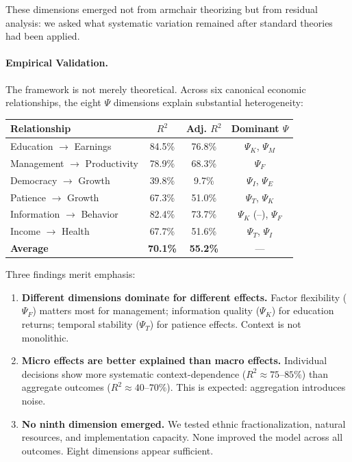 \documentclass[12pt,a4paper]{article}
\begin{document}
These dimensions emerged not from armchair theorizing but from residual analysis: we asked what systematic variation remained after standard theories had been applied.

\paragraph{Empirical Validation.}
The framework is not merely theoretical. Across six canonical economic relationships, the eight $\Psi$ dimensions explain substantial heterogeneity:

\begin{center}
\begin{tabular}{@{}lccc@{}}
\toprule
\textbf{Relationship} & \textbf{$R^2$} & \textbf{Adj. $R^2$} & \textbf{Dominant $\Psi$} \\
\midrule
Education $\rightarrow$ Earnings & 84.5\% & 76.8\% & $\Psi_K$, $\Psi_M$ \\
Management $\rightarrow$ Productivity & 78.9\% & 68.3\% & $\Psi_F$ \\
Democracy $\rightarrow$ Growth & 39.8\% & 9.7\% & $\Psi_I$, $\Psi_E$ \\
Patience $\rightarrow$ Growth & 67.3\% & 51.0\% & $\Psi_T$, $\Psi_K$ \\
Information $\rightarrow$ Behavior & 82.4\% & 73.7\% & $\Psi_K$ (--), $\Psi_F$ \\
Income $\rightarrow$ Health & 67.7\% & 51.6\% & $\Psi_T$, $\Psi_I$ \\
\midrule
\textbf{Average} & \textbf{70.1\%} & \textbf{55.2\%} & --- \\
\bottomrule
\end{tabular}
\end{center}

Three findings merit emphasis:
\begin{enumerate}
    \item \textbf{Different dimensions dominate for different effects.} Factor flexibility ($\Psi_F$) matters most for management; information quality ($\Psi_K$) for education returns; temporal stability ($\Psi_T$) for patience effects. Context is not monolithic.
    
    \item \textbf{Micro effects are better explained than macro effects.} Individual decisions show more systematic context-dependence ($R^2 \approx 75$--$85\%$) than aggregate outcomes ($R^2 \approx 40$--$70\%$). This is expected: aggregation introduces noise.
    
    \item \textbf{No ninth dimension emerged.} We tested ethnic fractionalization, natural resources, and implementation capacity. None improved the model across all outcomes. Eight dimensions appear sufficient.
\end{enumerate}
\end{document}
